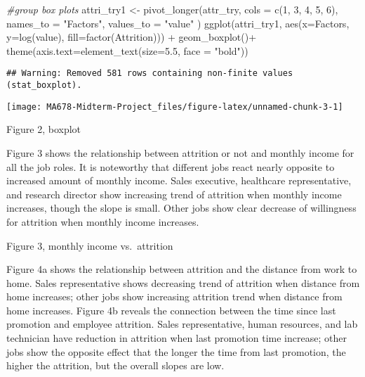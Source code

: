 \documentclass[
]{article}
\newenvironment{Shaded}{\begin{snugshade}}{\end{snugshade}}
\newcommand{\AttributeTok}[1]{\textcolor[rgb]{0.77,0.63,0.00}{#1}}
\newcommand{\CommentTok}[1]{\textcolor[rgb]{0.56,0.35,0.01}{\textit{#1}}}
\newcommand{\DecValTok}[1]{\textcolor[rgb]{0.00,0.00,0.81}{#1}}
\newcommand{\FloatTok}[1]{\textcolor[rgb]{0.00,0.00,0.81}{#1}}
\newcommand{\FunctionTok}[1]{\textcolor[rgb]{0.00,0.00,0.00}{#1}}
\newcommand{\NormalTok}[1]{#1}
\newcommand{\OtherTok}[1]{\textcolor[rgb]{0.56,0.35,0.01}{#1}}
\newcommand{\SpecialCharTok}[1]{\textcolor[rgb]{0.00,0.00,0.00}{#1}}
\newcommand{\StringTok}[1]{\textcolor[rgb]{0.31,0.60,0.02}{#1}}
\begin{document}
\begin{Shaded}
\begin{Highlighting}[]
\CommentTok{\#group box plots}
\NormalTok{attri\_try1 }\OtherTok{\textless{}{-}} \FunctionTok{pivot\_longer}\NormalTok{(attr\_try, }
                           \AttributeTok{cols =} \FunctionTok{c}\NormalTok{(}\DecValTok{1}\NormalTok{, }\DecValTok{3}\NormalTok{, }\DecValTok{4}\NormalTok{, }\DecValTok{5}\NormalTok{, }\DecValTok{6}\NormalTok{),}
                           \AttributeTok{names\_to =} \StringTok{"Factors"}\NormalTok{,}
                           \AttributeTok{values\_to =} \StringTok{"value"}
\NormalTok{                           )}
\FunctionTok{ggplot}\NormalTok{(attri\_try1, }\FunctionTok{aes}\NormalTok{(}\AttributeTok{x=}\NormalTok{Factors, }\AttributeTok{y=}\FunctionTok{log}\NormalTok{(value), }\AttributeTok{fill=}\FunctionTok{factor}\NormalTok{(Attrition))) }\SpecialCharTok{+} 
    \FunctionTok{geom\_boxplot}\NormalTok{()}\SpecialCharTok{+}
  \FunctionTok{theme}\NormalTok{(}\AttributeTok{axis.text=}\FunctionTok{element\_text}\NormalTok{(}\AttributeTok{size=}\FloatTok{5.5}\NormalTok{, }\AttributeTok{face =} \StringTok{"bold"}\NormalTok{))}
\end{Highlighting}
\end{Shaded}

\begin{verbatim}
## Warning: Removed 581 rows containing non-finite values (stat_boxplot).
\end{verbatim}

\begin{center}\texttt{[image: MA678-Midterm-Project\_files/figure-latex/unnamed-chunk-3-1]} \end{center}

Figure 2, boxplot

Figure 3 shows the relationship between attrition or not and monthly
income for all the job roles. It is noteworthy that different jobs react
nearly opposite to increased amount of monthly income. Sales executive,
healthcare representative, and research director show increasing trend
of attrition when monthly income increases, though the slope is small.
Other jobs show clear decrease of willingness for attrition when monthly
income increases.

Figure 3, monthly income vs.~attrition

Figure 4a shows the relationship between attrition and the distance from
work to home. Sales representative shows decreasing trend of attrition
when distance from home increases; other jobs show increasing attrition
trend when distance from home increases. Figure 4b reveals the
connection between the time since last promotion and employee attrition.
Sales representative, human resources, and lab technician have reduction
in attrition when last promotion time increase; other jobs show the
opposite effect that the longer the time from last promotion, the higher
the attrition, but the overall slopes are low.
\end{document}
